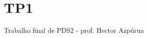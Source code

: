 \chapter{TP1}
\hypertarget{md_README}{}\label{md_README}
\label{md_README_autotoc_md0}%
%
Trabalho final de PDS2 -\/ prof. Hector Azpúrua 